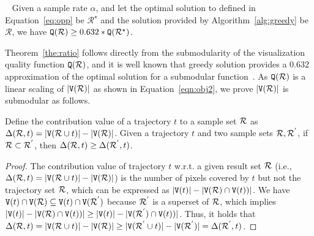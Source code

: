 \begin{theorem}~\label{the:ratio} Given a sample rate $\alpha$, and let the optimal solution to \prob{} defined in Equation~\eqref{eq:opp} be $\mathcal{R}^{\star}$ and the solution provided by Algorithm~\ref{alg:greedy} be $\mathcal{R}$, we have $\mathtt{Q}(\mathcal{R})\ge 0.632*\mathtt{Q}(\mathcal{R}^{\star})$.
\end{theorem}

Theorem~\ref{the:ratio} follows directly from the submodularity of the visualization quality function $\mathtt{Q}(\mathcal{R})$,
and it is well known that greedy solution provides a $0.632$ approximation of the optimal solution for a submodular function~\cite{fujishige2005submodular}.
As $\mathtt{Q}(\mathcal{R})$ is a linear scaling of $|\mathtt{V}(\mathcal{R})|$ as shown in Equation~\eqref{eqn:obj2}, we prove  $|\mathtt{V}(\mathcal{R})|$ is submodular as follows.

\begin{lemma}[Submodularity]\label{lem:submodular}
Define the contribution value of a trajectory $t$ to a sample set $\mathcal{R}$ as $\Delta(\mathcal{R}, t) = |\mathtt{V}(\mathcal{R} \cup t)| - |\mathtt{V}(\mathcal{R})|$.
Given a trajectory $t$ and two sample sets $\mathcal{R},\mathcal{R}^{'}$, if $\mathcal{R} \subset \mathcal{R}^{'}$, then $ \Delta(\mathcal{R}, t) \geq \Delta(\mathcal{R}^{'}, t)$.
\end{lemma}

\begin{proof}
The contribution value of trajectory $t$ w.r.t. a given result set $\mathcal{R}$ (i.e., $\Delta(\mathcal{R}, t) = |\mathtt{V}(\mathcal{R} \cup t)| - |\mathtt{V}(\mathcal{R})|$) is the number of pixels covered by $t$ but not the trajectory set $\mathcal{R}$,
which can be expressed as $|\mathtt{V}(t)| - |\mathtt{V}(\mathcal{R}) \cap \mathtt{V}(t))|$.
We have $\mathtt{V}(t) \cap \mathtt{V}(\mathcal{R}) \subseteq \mathtt{V}(t) \cap \mathtt{V}(\mathcal{R}^{'}) $ because $\mathcal{R}^{'}$ is a superset of $\mathcal{R}$, which implies $|\mathtt{V}(t)| - |\mathtt{V}(\mathcal{R}) \cap \mathtt{V}(t))| \geq |\mathtt{V}(t)| - |\mathtt{V}(\mathcal{R}^{'})\cap \mathtt{V}(t))|$.
Thus, it holds that $\Delta(\mathcal{R}, t) = |\mathtt{V}(\mathcal{R} \cup t)| - |\mathtt{V}(\mathcal{R})| \geq |\mathtt{V}(\mathcal{R}^{'} \cup t)| - |\mathtt{V}(\mathcal{R}^{'})|= \Delta(\mathcal{R}^{'}, t)$.
\end{proof}


